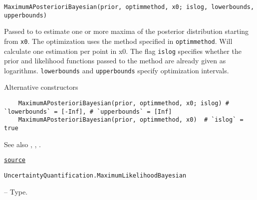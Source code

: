 \begin{adjustwidth}{2em}{0pt}


\begin{verbatim}
MaximumAPosterioriBayesian(prior, optimmethod, x0; islog, lowerbounds, upperbounds)
\end{verbatim}

Passed to  to estimate one or more maxima of the posterior distribution starting from \texttt{x0}. The optimization uses the method specified in \texttt{optimmethod}. Will calculate one estimation per point in x0. The flag \texttt{islog} specifies whether the prior and likelihood functions passed to the   method are already  given as logarithms. \texttt{lowerbounds} and \texttt{upperbounds} specify optimization intervals.

Alternative constructors


\begin{verbatim}
    MaximumAPosterioriBayesian(prior, optimmethod, x0; islog) # `lowerbounds` = [-Inf], # `upperbounds` = [Inf]
    MaximumAPosterioriBayesian(prior, optimmethod, x0)  # `islog` = true
\end{verbatim}

See also , ,  .



\href{https://github.com/friesischscott/UncertaintyQuantification.jl/blob/f5ee6cce729f0d6a57979257379c942cdf42f86f/src/modelupdating/bayesianMAP.jl#L1-L13}{\texttt{source}}


\end{adjustwidth}
\hypertarget{7464647358232787048}{\texttt{UncertaintyQuantification.MaximumLikelihoodBayesian}}  -- {Type.}

